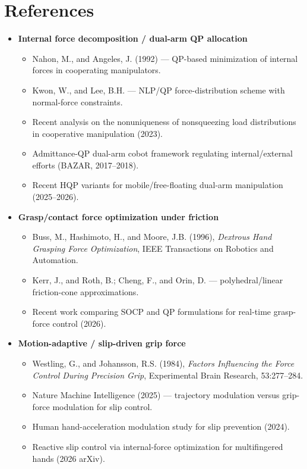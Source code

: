 \documentclass[conference]{IEEEtran}
\begin{document}
\section{References}
\begin{itemize}
    \item \textbf{Internal force decomposition / dual-arm QP allocation}
    \begin{itemize}
        \item Nahon, M., and Angeles, J. (1992) --- QP-based minimization of internal forces in cooperating manipulators.
        \item Kwon, W., and Lee, B.H. --- NLP/QP force-distribution scheme with normal-force constraints.
        \item Recent analysis on the nonuniqueness of nonsqueezing load distributions in cooperative manipulation (2023).
        \item Admittance-QP dual-arm cobot framework regulating internal/external efforts (BAZAR, 2017--2018).
        \item Recent HQP variants for mobile/free-floating dual-arm manipulation (2025--2026).
    \end{itemize}

    \item \textbf{Grasp/contact force optimization under friction}
    \begin{itemize}
        \item Buss, M., Hashimoto, H., and Moore, J.B. (1996), \emph{Dextrous Hand Grasping Force Optimization}, IEEE Transactions on Robotics and Automation.
        \item Kerr, J., and Roth, B.; Cheng, F., and Orin, D. --- polyhedral/linear friction-cone approximations.
        \item Recent work comparing SOCP and QP formulations for real-time grasp-force control (2026).
    \end{itemize}

    \item \textbf{Motion-adaptive / slip-driven grip force}
    \begin{itemize}
        \item Westling, G., and Johansson, R.S. (1984), \emph{Factors Influencing the Force Control During Precision Grip}, Experimental Brain Research, 53:277--284.
        \item Nature Machine Intelligence (2025) --- trajectory modulation versus grip-force modulation for slip control.
        \item Human hand-acceleration modulation study for slip prevention (2024).
        \item Reactive slip control via internal-force optimization for multifingered hands (2026 arXiv).
    \end{itemize}


\end{itemize}
\end{document}
